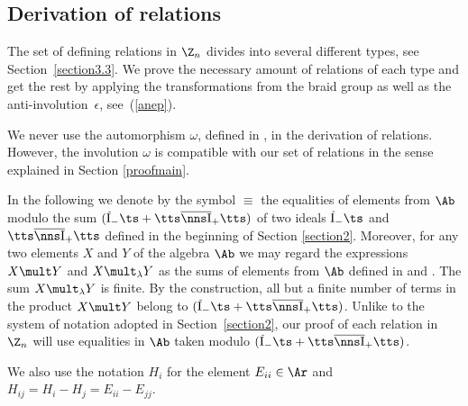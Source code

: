 \documentclass[pdftex]{sigma}
\def\Ib{\tts\overline{\nns\rm I}_+\tts}\def\J{\mathrm{J}}\def\Jb{\,\overline{\!\rm I}_-\ts}\def\k{\mathfrak{k}}
\numberwithin{equation}{section}
\begin{document}
\subsection{Derivation of relations}\label{sectionDerRel}

The set  of def\/ining relations in $\Z_n$ divides into several dif\/ferent types,
see Section~\ref{section3.3}. We prove the necessary amount of relations
of each type and get the rest by applying the transformations from the braid group as well as the anti-involution~$\epsilon$, see~(\ref{anep}).


We never use the automorphism $\omega$, def\/ined in , in the derivation of relations. However, the involution $\omega$ is compatible with our set
of relations in the sense explained in Section \ref{proofmain}.


In the following we denote by the symbol $ \equiv $ the equalities of elements from $\Ab$ modulo the sum $(\Jb+\Ib )$ of two ideals $\Jb$ and $\Ib$
def\/ined in the beginning of Section \ref{section2}. Moreover,
for any two elements $X$ and $Y$ of the algebra $\Ab$ we may regard the expressions $X\mult Y$ and $X\mult_\lambda Y$ as the sums
of elements from $\Ab$ def\/ined in  and . The sum $X\mult_\lambda Y$  is f\/inite. By the construction,
all but a f\/inite number of terms in the product $X\mult Y$ belong to $(\Jb+\Ib )$. Unlike to the system of notation
adopted in Section~\ref{section2}, our proof of each relation in $\Z_n$ will use equalities in $\Ab$ taken modulo $(\Jb+\Ib )$.


We also use the notation $H_i$ for the element $E_{ii}\in\Ar$ and $H_{ij}=H_i-H_j=E_{ii}-E_{jj}$.
\end{document}
